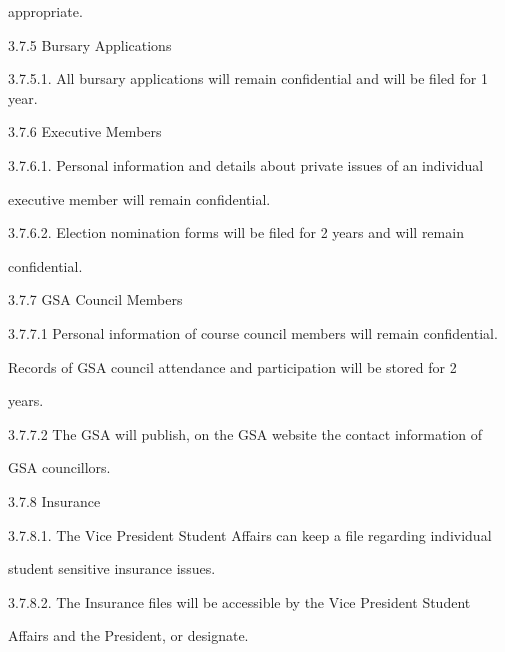  appropriate. 
 
 3.7.5 Bursary Applications 
 
 3.7.5.1. All bursary applications will remain confidential and will be filed for 1 year. 
 
 3.7.6 Executive Members 
 
 3.7.6.1. Personal information and details about private issues of an individual 
 
 executive member will remain confidential. 
 
 3.7.6.2. Election nomination forms will be filed for 2 years and will remain 
 
 confidential. 
 
 
 3.7.7 GSA Council Members 
 
 3.7.7.1 Personal information of course council members will remain confidential. 
 
 Records of GSA council attendance and participation will be stored for 2 
 
 years. 
 
 3.7.7.2 The GSA will publish, on the GSA website the contact information of 
 
 GSA councillors. 
 
 3.7.8 Insurance 
 
 3.7.8.1. The Vice President Student Affairs can keep a file regarding individual 
 
 student sensitive insurance issues. 
 
 3.7.8.2. The Insurance files will be accessible by the Vice President Student 
 
 Affairs and the President, or designate.